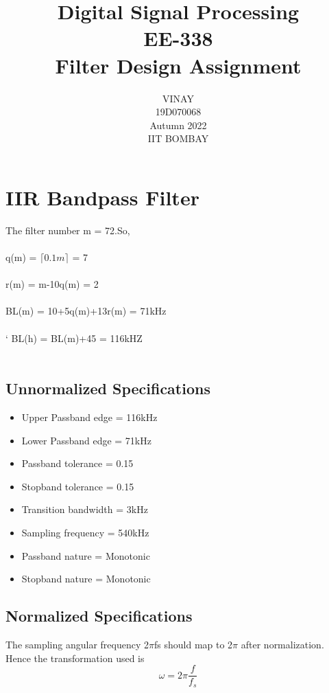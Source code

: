 \documentclass[12pt]{article}
\title{\LARGE{\textbf{Digital Signal Processing}}\\
\textbf{EE-338}\\
\textbf{Filter Design Assignment}}
\author{VINAY\\
19D070068\\
Autumn 2022\\
IIT BOMBAY}
\begin{document}
\maketitle
\begingroup
\color{blue}
\tableofcontents
\endgroup
\newpage
{}
\section{\textbf{IIR Bandpass Filter}}
The filter number m = 72.So,\\\\
q(m) = $\lceil 0.1m \rceil$ = 7\\\\
r(m) = m-10q(m) = 2\\\\
BL(m) =  10+5q(m)+13r(m) = 71kHz\\\\`
BL(h) = BL(m)+45 = 116kHZ\\ \\

\subsection{\textbf{Unnormalized Specifications}}
\begin{itemize}
    \item Upper Passband edge = 116kHz
    \item Lower Passband edge = 71kHz
    \item Passband tolerance = 0.15
    \item Stopband tolerance = 0.15
    \item Transition bandwidth = 3kHz
    \item Sampling frequency = 540kHz
    \item Passband nature = Monotonic
    \item Stopband nature = Monotonic
\end{itemize}

\subsection{\textbf{Normalized Specifications}}
The sampling angular frequency 2$\pi$fs should map to 2$\pi$ after normalization.
Hence the transformation used is
\begin{equation*}
    \omega = 2\pi\frac{f}{f_s}
\end{equation*}
\\
\end{document}
